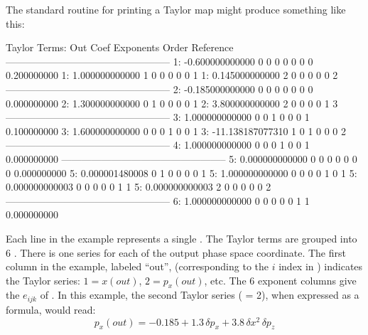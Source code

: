 The standard \bmad routine for printing a Taylor map might produce something like this:
\begin{example}
   Taylor Terms:
   Out      Coef             Exponents          Order       Reference
   --------------------------------------------------
    1:     -0.600000000000   0  0  0  0  0  0       0       0.200000000
    1:      1.000000000000   1  0  0  0  0  0       1
    1:      0.145000000000   2  0  0  0  0  0       2
   --------------------------------------------------
    2:     -0.185000000000   0  0  0  0  0  0       0       0.000000000
    2:      1.300000000000   0  1  0  0  0  0       1
    2:      3.800000000000   2  0  0  0  0  1       3
   --------------------------------------------------
    3:      1.000000000000   0  0  1  0  0  0       1       0.100000000
    3:      1.600000000000   0  0  0  1  0  0       1
    3:    -11.138187077310   1  0  1  0  0  0       2
   --------------------------------------------------
    4:      1.000000000000   0  0  0  1  0  0       1       0.000000000
   --------------------------------------------------
    5:      0.000000000000   0  0  0  0  0  0       0       0.000000000
    5:      0.000001480008   0  1  0  0  0  0       1
    5:      1.000000000000   0  0  0  0  1  0       1
    5:      0.000000000003   0  0  0  0  0  1       1
    5:      0.000000000003   2  0  0  0  0  0       2
   --------------------------------------------------
    6:      1.000000000000   0  0  0  0  0  1       1       0.000000000
\end{example}
Each line in the example represents a single . The Taylor terms are grouped into 6
. There is one series for each of the output phase space coordinate. The first
column in the example, labeled ``out'', (corresponding to the $i$ index in ) indicates the
Taylor series: $1 = x(out)$, $2 = p_x(out)$, etc. The 6 exponent columns give the $e_{ijk}$ of
. In this example, the second Taylor series ( = 2), when expressed as a formula,
would read:
\begin{equation}
  p_x(out) = -0.185 + 1.3 \, \delta p_x + 3.8 \, \delta x^2 \, \delta p_z
\end{equation}

